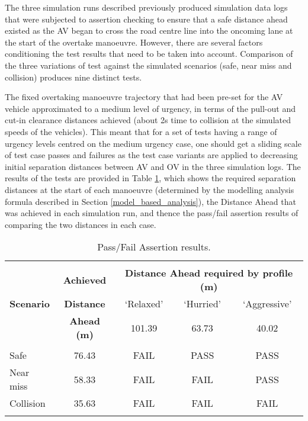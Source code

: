 The three simulation runs described previously produced simulation data logs that were subjected to assertion checking to ensure that a safe distance ahead existed as the AV began to cross the road centre line into the oncoming lane at the start of the overtake manoeuvre. However, there are several factors conditioning the test results that need to be taken into account. 
%
Comparison of the three variations of test against the simulated scenarios (safe, near miss and collision) produces nine distinct tests. 

The fixed overtaking manoeuvre trajectory that had been pre-set for the AV vehicle approximated to a medium level of urgency, in terms of the pull-out and cut-in clearance distances achieved (about 2s time to collision at the simulated speeds of the vehicles). This meant that for a set of tests having a range of urgency levels centred on the medium urgency case, one should get a sliding scale of test case passes and failures as the test case variants are applied to decreasing initial separation distances between AV and OV in the three simulation logs. The results of the tests are provided in Table \ref{Overtaking_Profiles}, which shows the required separation distances at the start of each manoeuvre (determined by the modelling analysis formula described in Section \ref{model_based_analysis}), the Distance Ahead that was achieved in each simulation run, and thence the pass/fail assertion results of comparing the two distances in each case.

\begin{table}[h]
\centering
\begin{tabular}{lcccc}
\hline
\\
\multirow{3}{*}{\textbf{Scenario}} & \textbf{Achieved} & \multicolumn{3}{c}{
\textbf{Distance Ahead required by profile (m)}}\\ %
& \textbf{Distance} & `Relaxed' & `Hurried' & `Aggressive' \\
& \textbf{Ahead (m)} & 101.39 & 63.73 & 40.02 \\
\\
%
Safe & 76.43 & FAIL & PASS & PASS\\
%
Near miss & 58.33 & FAIL & FAIL & PASS\\
%
Collision & 35.63 & FAIL & FAIL & FAIL\\
\\
\hline
\end{tabular}
\caption{Pass/Fail Assertion results.} \label{Overtaking_Profiles}
\end{table}

